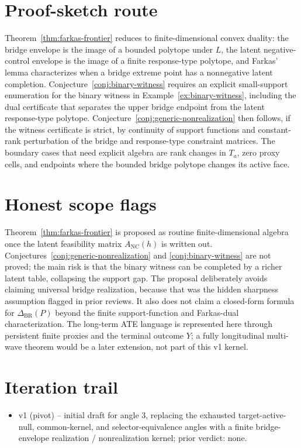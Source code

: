 \documentclass[11pt]{article}
\theoremstyle{definition}
\theoremstyle{plain}
\theoremstyle{remark}
\begin{document}
\section{Proof-sketch route}
Theorem~\ref{thm:farkas-frontier} reduces to finite-dimensional convex duality:
the bridge envelope is the image of a bounded polytope under \(L\), the latent
negative-control envelope is the image of a finite response-type polytope, and
Farkas' lemma characterizes when a bridge extreme point has a nonnegative
latent completion.  Conjecture~\ref{conj:binary-witness} requires an explicit
small-support enumeration for the binary witness in Example~\ref{ex:binary-witness},
including the dual certificate that separates the upper bridge endpoint from
the latent response-type polytope.  Conjecture~\ref{conj:generic-nonrealization}
then follows, if the witness certificate is strict, by continuity of support
functions and constant-rank perturbation of the bridge and response-type
constraint matrices.  The boundary cases that need explicit algebra are
rank changes in \(T_a\), zero proxy cells, and endpoints where the bounded
bridge polytope changes its active face.

\section{Honest scope flags}
Theorem~\ref{thm:farkas-frontier} is proposed as routine finite-dimensional
algebra once the latent feasibility matrix \(A_{\mathrm{NC}}(h)\) is written
out.  Conjectures~\ref{conj:generic-nonrealization} and
\ref{conj:binary-witness} are not proved; the main risk is that the binary
witness can be completed by a richer latent table, collapsing the support gap.
The proposal deliberately avoids claiming universal bridge realization, because
that was the hidden sharpness assumption flagged in prior reviews.  It also
does not claim a closed-form formula for \(\Delta_{\mathrm{BR}}(P)\) beyond the
finite support-function and Farkas-dual characterization.  The long-term ATE
language is represented here through persistent finite proxies and the terminal
outcome \(Y\); a fully longitudinal multi-wave theorem would be a later
extension, not part of this v1 kernel.

\section{Iteration trail}
\begin{itemize}[leftmargin=*]
\item v1 (pivot) -- initial draft for angle 3, replacing the exhausted
target-active-null, common-kernel, and selector-equivalence angles with a
finite bridge-envelope realization / nonrealization kernel; prior verdict:
none.
\end{itemize}
\end{document}
